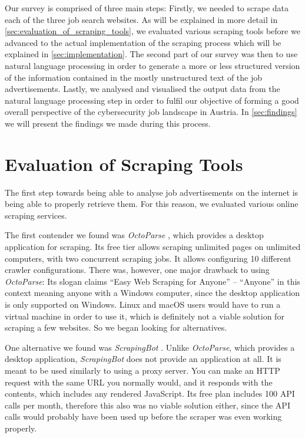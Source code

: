 \documentclass[runningheads]{llncs}
\begin{document}
Our survey is comprised of three main steps: Firstly, we needed to scrape data each of the three job search websites. As will be explained in more detail in \autoref{sec:evaluation_of_scraping_tools}, we evaluated various scraping tools before we advanced to the actual implementation of the scraping process which will be explained in \autoref{sec:implementation}. The second part of our survey was then to use natural language processing in order to generate a more or less structured version of the information contained in the mostly unstructured text of the job advertisements. Lastly, we analysed and visualised the output data from the natural language processing step in order to fulfil our objective of forming a good overall perspective of the cybersecurity job landscape in Austria. In \autoref{sec:findings} we will present the findings we made during this process.

\section{Evaluation of Scraping Tools}
\label{sec:evaluation_of_scraping_tools}

The first step towards being able to analyse job advertisements on the internet is being able to properly retrieve them. For this reason, we evaluated various online scraping services.

The first contender we found was \textit{OctoParse} \cite{octoparse}, which provides a desktop application for scraping. Its free tier allows scraping unlimited pages on unlimited computers, with two concurrent scraping jobs. It allows configuring 10 different crawler configurations. There was, however, one major drawback to using \textit{OctoParse}: Its slogan claims “Easy Web Scraping for Anyone” – “Anyone” in this context meaning anyone with a Windows computer, since the desktop application is only supported on Windows. Linux and macOS users would have to run a virtual machine in order to use it, which is definitely not a viable solution for scraping a few websites. So we began looking for alternatives.

One alternative we found was \textit{ScrapingBot} \cite{scrapingbot}. Unlike \textit{OctoParse}, which provides a desktop application, \textit{ScrapingBot} does not provide an application at all. It is meant to be used similarly to using a proxy server. You can make an HTTP request with the same URL you normally would, and it responds with the contents, which includes any rendered JavaScript. Its free plan includes 100 API calls per month, therefore this also was no viable solution either, since the API calls would probably have been used up before the scraper was even working properly.
\end{document}

